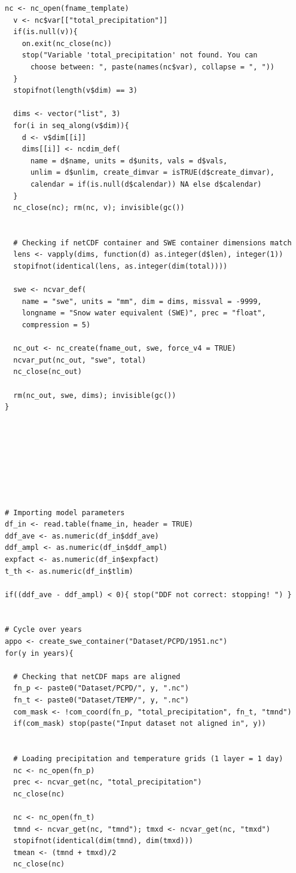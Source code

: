 \begin{lstlisting}[style=Rcode, caption={Model implementation. This code was used to generate the SWE maps.}, label={lst:swe}]
  nc <- nc_open(fname_template)
  v <- nc$var[["total_precipitation"]]
  if(is.null(v)){
    on.exit(nc_close(nc))
    stop("Variable 'total_precipitation' not found. You can 
      choose between: ", paste(names(nc$var), collapse = ", "))
  }
  stopifnot(length(v$dim) == 3)
  
  dims <- vector("list", 3)
  for(i in seq_along(v$dim)){
    d <- v$dim[[i]]
    dims[[i]] <- ncdim_def(
      name = d$name, units = d$units, vals = d$vals,
      unlim = d$unlim, create_dimvar = isTRUE(d$create_dimvar),
      calendar = if(is.null(d$calendar)) NA else d$calendar)
  }
  nc_close(nc); rm(nc, v); invisible(gc())
  
  
  # Checking if netCDF container and SWE container dimensions match
  lens <- vapply(dims, function(d) as.integer(d$len), integer(1))
  stopifnot(identical(lens, as.integer(dim(total))))
  
  swe <- ncvar_def(
    name = "swe", units = "mm", dim = dims, missval = -9999, 
    longname = "Snow water equivalent (SWE)", prec = "float", 
    compression = 5)
  
  nc_out <- nc_create(fname_out, swe, force_v4 = TRUE)
  ncvar_put(nc_out, "swe", total)
  nc_close(nc_out)
  
  rm(nc_out, swe, dims); invisible(gc())
}








# Importing model parameters
df_in <- read.table(fname_in, header = TRUE)
ddf_ave <- as.numeric(df_in$ddf_ave)
ddf_ampl <- as.numeric(df_in$ddf_ampl)
expfact <- as.numeric(df_in$expfact)
t_th <- as.numeric(df_in$tlim)

if((ddf_ave - ddf_ampl) < 0){ stop("DDF not correct: stopping! ") }


# Cycle over years
appo <- create_swe_container("Dataset/PCPD/1951.nc")
for(y in years){

  # Checking that netCDF maps are aligned
  fn_p <- paste0("Dataset/PCPD/", y, ".nc")
  fn_t <- paste0("Dataset/TEMP/", y, ".nc")
  com_mask <- !com_coord(fn_p, "total_precipitation", fn_t, "tmnd")
  if(com_mask) stop(paste("Input dataset not aligned in", y))
  
  
  # Loading precipitation and temperature grids (1 layer = 1 day)
  nc <- nc_open(fn_p)
  prec <- ncvar_get(nc, "total_precipitation")
  nc_close(nc)
  
  nc <- nc_open(fn_t)
  tmnd <- ncvar_get(nc, "tmnd"); tmxd <- ncvar_get(nc, "tmxd")
  stopifnot(identical(dim(tmnd), dim(tmxd)))
  tmean <- (tmnd + tmxd)/2
  nc_close(nc)
  

\end{lstlisting}
